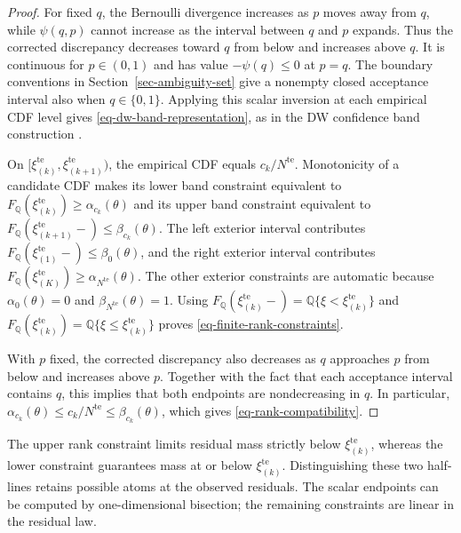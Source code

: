 \documentclass[review,11pt,3p,authoryear,nopreprintline]{elsarticle}
\begin{document}
\begin{proof}
  For fixed $q$, the Bernoulli divergence increases as $p$ moves away from $q$, while $\psi(q,p)$ cannot increase as the interval between $q$ and $p$ expands. Thus the corrected discrepancy decreases toward $q$ from below and increases above $q$. It is continuous for $p\in(0,1)$ and has value $-\psi(q)\le0$ at $p=q$. The boundary conventions in Section~\ref{sec-ambiguity-set} give a nonempty closed acceptance interval also when $q\in\{0,1\}$. Applying this scalar inversion at each empirical CDF level gives \eqref{eq-dw-band-representation}, as in the DW confidence band construction \citep[Supplement, Section~S.6]{L.J23}.

  On $[\xi_{(k)}^{\mathrm{te}},\xi_{(k+1)}^{\mathrm{te}})$, the empirical CDF equals $c_k/N^{\mathrm{te}}$. Monotonicity of a candidate CDF makes its lower band constraint equivalent to $F_{\mathbb Q}\left(\xi_{(k)}^{\mathrm{te}}\right)\ge\alpha_{c_k}(\theta)$ and its upper band constraint equivalent to $F_{\mathbb Q}\left(\xi_{(k+1)}^{\mathrm{te}}-\right)\le\beta_{c_k}(\theta)$. The left exterior interval contributes $F_{\mathbb Q}\left(\xi_{(1)}^{\mathrm{te}}-\right)\le\beta_0(\theta)$, and the right exterior interval contributes $F_{\mathbb Q}\left(\xi_{(K)}^{\mathrm{te}}\right)\ge\alpha_{N^{\mathrm{te}}}(\theta)$. The other exterior constraints are automatic because $\alpha_0(\theta)=0$ and $\beta_{N^{\mathrm{te}}}(\theta)=1$. Using $F_{\mathbb Q}\left(\xi_{(k)}^{\mathrm{te}}-\right)=\mathbb Q\{\xi<\xi_{(k)}^{\mathrm{te}}\}$ and $F_{\mathbb Q}\left(\xi_{(k)}^{\mathrm{te}}\right)=\mathbb Q\{\xi\le \xi_{(k)}^{\mathrm{te}}\}$ proves \eqref{eq-finite-rank-constraints}.

  With $p$ fixed, the corrected discrepancy also decreases as $q$ approaches $p$ from below and increases above $p$. Together with the fact that each acceptance interval contains $q$, this implies that both endpoints are nondecreasing in $q$. In particular,
  $\alpha_{c_k}(\theta)\le c_k/N^{\mathrm{te}}\le\beta_{c_k}(\theta)$, which gives \eqref{eq-rank-compatibility}.
\end{proof}

The upper rank constraint limits residual mass strictly below $\xi_{(k)}^{\mathrm{te}}$, whereas the lower constraint guarantees mass at or below $\xi_{(k)}^{\mathrm{te}}$. Distinguishing these two half-lines retains possible atoms at the observed residuals. The scalar endpoints can be computed by one-dimensional bisection; the remaining constraints are linear in the residual law.
\end{document}
